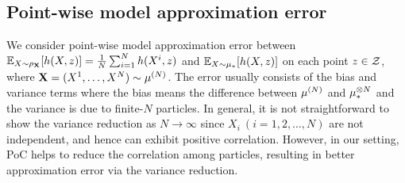 \subsection{Point-wise model approximation error}\label{subsec:pw_model_error}
We consider point-wise model approximation error between $\mathbb{E}_{X\sim \rho_{\mathbf{X}}}[h(X,z)] = \frac{1}{N}\sum_{i=1}^N h(X^i,z)$ and $\mathbb{E}_{X\sim \mu_*}[h(X,z)]$ on each point $z \in \mathcal{Z}$, where $\vX=(X^1,\ldots,X^N)\sim \pow[\mu,N]$.
The error usually consists of the bias and variance terms where the bias means the difference between $\pow[\mu,N]$ and $\tensor[\mu_*,N]$ and the variance is due to finite-$N$ particles. In general, it is not straightforward to show the variance reduction as $N \to \infty$ since $X_i~(i=1,2,\ldots,N)$ are not independent, and hence can exhibit positive correlation.
However, in our setting, PoC helps to reduce the correlation among particles, resulting in better approximation error via the variance reduction.

